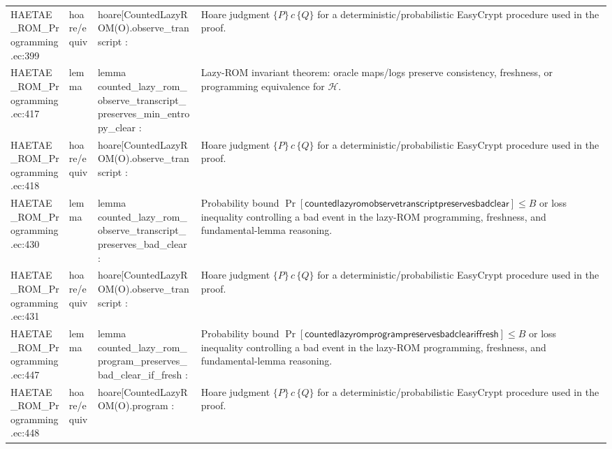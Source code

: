 \documentclass[10pt]{article}
\begin{document}
\begin{longtable}{L{0.11\textwidth}L{0.055\textwidth}L{0.385\textwidth}L{0.41\textwidth}}
HAETAE\_\allowbreak{}ROM\_\allowbreak{}Programming.\allowbreak{}ec:\allowbreak{}399 & hoare/equiv & {\ttfamily\scriptsize hoare[CountedLazyROM(O).observe\_\allowbreak{}transcript :} & Hoare judgment $\{P\}\,c\,\{Q\}$ for a deterministic/probabilistic EasyCrypt procedure used in the proof. \\
HAETAE\_\allowbreak{}ROM\_\allowbreak{}Programming.\allowbreak{}ec:\allowbreak{}417 & lemma & {\ttfamily\scriptsize lemma counted\_\allowbreak{}lazy\_\allowbreak{}rom\_\allowbreak{}observe\_\allowbreak{}transcript\_\allowbreak{}preserves\_\allowbreak{}min\_\allowbreak{}entropy\_\allowbreak{}clear :} & Lazy-ROM invariant theorem: oracle maps/logs preserve consistency, freshness, or programming equivalence for $\mathcal H$. \\
HAETAE\_\allowbreak{}ROM\_\allowbreak{}Programming.\allowbreak{}ec:\allowbreak{}418 & hoare/equiv & {\ttfamily\scriptsize hoare[CountedLazyROM(O).observe\_\allowbreak{}transcript :} & Hoare judgment $\{P\}\,c\,\{Q\}$ for a deterministic/probabilistic EasyCrypt procedure used in the proof. \\
HAETAE\_\allowbreak{}ROM\_\allowbreak{}Programming.\allowbreak{}ec:\allowbreak{}430 & lemma & {\ttfamily\scriptsize lemma counted\_\allowbreak{}lazy\_\allowbreak{}rom\_\allowbreak{}observe\_\allowbreak{}transcript\_\allowbreak{}preserves\_\allowbreak{}bad\_\allowbreak{}clear :} & Probability bound $\Pr[\mathsf{countedlazyromobservetranscriptpreservesbadclear}]\le B$ or loss inequality controlling a bad event in the lazy-ROM programming, freshness, and fundamental-lemma reasoning. \\
HAETAE\_\allowbreak{}ROM\_\allowbreak{}Programming.\allowbreak{}ec:\allowbreak{}431 & hoare/equiv & {\ttfamily\scriptsize hoare[CountedLazyROM(O).observe\_\allowbreak{}transcript :} & Hoare judgment $\{P\}\,c\,\{Q\}$ for a deterministic/probabilistic EasyCrypt procedure used in the proof. \\
HAETAE\_\allowbreak{}ROM\_\allowbreak{}Programming.\allowbreak{}ec:\allowbreak{}447 & lemma & {\ttfamily\scriptsize lemma counted\_\allowbreak{}lazy\_\allowbreak{}rom\_\allowbreak{}program\_\allowbreak{}preserves\_\allowbreak{}bad\_\allowbreak{}clear\_\allowbreak{}if\_\allowbreak{}fresh :} & Probability bound $\Pr[\mathsf{countedlazyromprogrampreservesbadcleariffresh}]\le B$ or loss inequality controlling a bad event in the lazy-ROM programming, freshness, and fundamental-lemma reasoning. \\
HAETAE\_\allowbreak{}ROM\_\allowbreak{}Programming.\allowbreak{}ec:\allowbreak{}448 & hoare/equiv & {\ttfamily\scriptsize hoare[CountedLazyROM(O).program :} & Hoare judgment $\{P\}\,c\,\{Q\}$ for a deterministic/probabilistic EasyCrypt procedure used in the proof. \\

\end{longtable}
\end{document}
